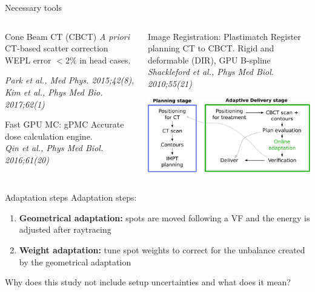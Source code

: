 \begin{frame}[c]{Necessary tools}
	\begin{columns}[t]
		\begin{column}{0.5\textwidth}
        {
        \begin{block}{Cone Beam CT (CBCT)}
            \textit{A priori} CT-based scatter correction WEPL error $< 2\%$ in head cases.\\
            {\begin{flushright}\scriptsize\textit{Park et al., Med Phys. 2015;42(8)}, \textit{Kim et al., Phys Med Bio. 2017;62(1)}\end{flushright}}
        \end{block}}
        {
        \begin{block}{Fast GPU MC: gPMC}
            Accurate dose calculation engine.\\
            {\hfill\scriptsize\textit{Qin et al., Phys Med Biol. 2016;61(20)}}
        \end{block}}
		\end{column}
		\begin{column}{0.5\textwidth}
			{
            \begin{block}{Image Registration: Plastimatch}
                Register planning CT to CBCT. Rigid and deformable (DIR), GPU B-spline\\
                {\hfill\scriptsize\textit{Shackleford et al., Phys Med Biol. 2010;55(21)}}
            \end{block}}
            \includegraphics[width=\textwidth]{imgs/workflow_adaptive_2.pdf}
		\end{column}
	\end{columns}
\end{frame}


\begin{frame}[c]{Adaptation steps}
    Adaptation steps:
    \begin{enumerate}
        \item \textbf{Geometrical adaptation:} spots are moved following a VF and the energy is adjusted after raytracing
        \item \textbf{Weight adaptation:} tune spot weights to correct for the unbalance created by the geometrical adaptation
    \end{enumerate}
    \pause
    Why does this study not include setup uncertainties and what does it mean?
\end{frame}


